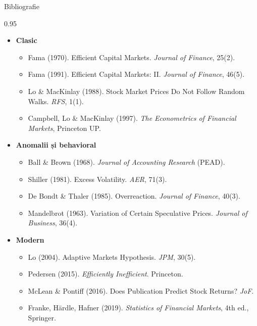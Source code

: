 \documentclass[9pt, aspectratio=169, t]{beamer}
\begin{document}
\begin{frame}[shrink=15]{Bibliografie}
\begin{cminipage}{0.95\textwidth}
\begin{itemize}\setlength{\itemsep}{0pt}
    \item \textbf{Clasic}
    \begin{itemize}\setlength{\itemsep}{0pt}
        \item Fama (1970). Efficient Capital Markets. \textit{Journal of Finance}, 25(2).
        \item Fama (1991). Efficient Capital Markets: II. \textit{Journal of Finance}, 46(5).
        \item Lo \& MacKinlay (1988). Stock Market Prices Do Not Follow Random Walks. \textit{RFS}, 1(1).
        \item Campbell, Lo \& MacKinlay (1997). \textit{The Econometrics of Financial Markets}, Princeton UP.
    \end{itemize}
    \item \textbf{Anomalii și behavioral}
    \begin{itemize}\setlength{\itemsep}{0pt}
        \item Ball \& Brown (1968). \textit{Journal of Accounting Research} (PEAD).
        \item Shiller (1981). Excess Volatility. \textit{AER}, 71(3).
        \item De Bondt \& Thaler (1985). Overreaction. \textit{Journal of Finance}, 40(3).
        \item Mandelbrot (1963). Variation of Certain Speculative Prices. \textit{Journal of Business}, 36(4).
    \end{itemize}
    \item \textbf{Modern}
    \begin{itemize}\setlength{\itemsep}{0pt}
        \item Lo (2004). Adaptive Markets Hypothesis. \textit{JPM}, 30(5).
        \item Pedersen (2015). \textit{Efficiently Inefficient}. Princeton.
        \item McLean \& Pontiff (2016). Does Publication Predict Stock Returns? \textit{JoF}.
        \item Franke, H\"{a}rdle, Hafner (2019). \textit{Statistics of Financial Markets}, 4th ed., Springer.
    \end{itemize}
\end{itemize}
\end{cminipage}
\end{frame}
\end{document}
